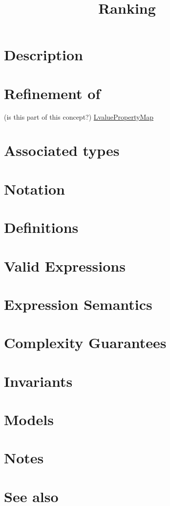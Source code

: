 \documentclass{article}
\begin{document}
\title{Ranking}
\maketitle

\section*{Description}
\section*{Refinement of}

(is this part of this concept?)
\href{http://www.boost.org/libs/property_map/LvaluePropertyMap.html}{LvaluePropertyMap}

\section*{Associated types}
\section*{Notation}
\section*{Definitions}
\section*{Valid Expressions}
\section*{Expression Semantics}
\section*{Complexity Guarantees}
\section*{Invariants}
\section*{Models}
\section*{Notes}
\section*{See also}




\end{document}
